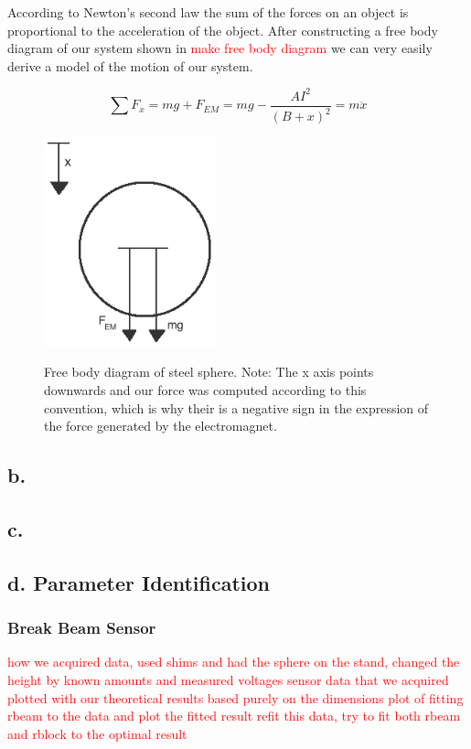 \documentclass{article}
\newcommand{\xxx}[1]{\textcolor{red}{#1}}
\theoremstyle{plain}
\theoremstyle{definition}
\theoremstyle{remark}
\begin{document}
According to Newton's second law the sum of the forces on an object is proportional to the acceleration of the object.  After constructing a free body diagram of our system shown in \xxx{make free body diagram} we can very easily derive a model of the motion of our system.

$$ \sum F_x = mg + F_{EM} = mg -\frac{A I^2}{(B+x)^2} = m  \ddot{x}$$

\begin{figure}
\begin{center}
\includegraphics[width = 5cm]{freebodydiagram.png}
\label{Q1_a4}
\caption{Free body diagram of steel sphere.  Note: The x axis points downwards and our force was computed according to this convention, which is why their is a negative sign in the expression of the force generated by the electromagnet.}
\end{center}
\end{figure}

\subsection*{b.}

\subsection*{c.}

\subsection*{d. Parameter Identification}

\subsubsection{Break Beam Sensor}
\xxx{how we acquired data, used shims and had the sphere on the stand, changed the height by known amounts and measured voltages}
\xxx{sensor data that we acquired plotted with our theoretical results based purely on the dimensions}
\xxx{plot of fitting rbeam to the data and plot the fitted result}
\xxx{refit this data, try to fit both rbeam and rblock to the optimal result}
\end{document}
